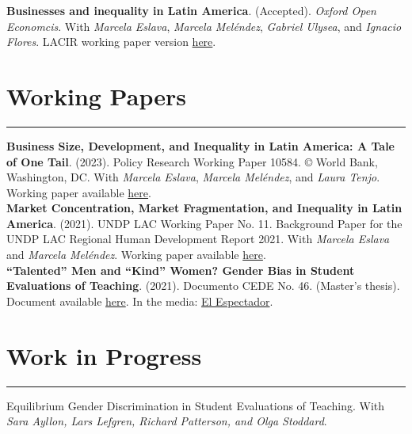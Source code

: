 \documentclass[12pt, letterpaper]{article}
\begin{document}
\noindent \textbf{Businesses and inequality in Latin America}. (Accepted). \textit{Oxford Open Economcis}.   With \textit{Marcela Eslava}, \textit{Marcela Meléndez}, \textit{Gabriel Ulysea}, and \textit{Ignacio Flores}. LACIR working paper version \href{https://eprints.lse.ac.uk/122760/1/WP_138.pdf}{here}. 

\vspace*{-4mm}

\section*{Working Papers}
\vspace*{-8mm}
\noindent \rule{\linewidth}{0.2mm}

\noindent \textbf{Business Size, Development, and Inequality in Latin America: A Tale of One Tail}. (2023). Policy Research Working Paper 10584. © World Bank, Washington, DC. With \textit{Marcela Eslava}, \textit{Marcela Meléndez}, and \textit{Laura Tenjo}. Working paper available \href{https://nicolasurdaneta.github.io/documents/WB_Business_Size.pdf}{here}. \\ [-3mm]

\noindent \textbf{Market Concentration, Market Fragmentation, and Inequality in Latin America}. (2021). UNDP LAC Working Paper No. 11. Background Paper for the UNDP LAC Regional Human Development Report 2021.  With \textit{Marcela Eslava} and \textit{Marcela Meléndez}. Working paper available \href{https://www.latinamerica.undp.org/content/rblac/en/home/library/poverty/market-concentration--market-fragmentation--and-inequality-in-la.html}{here}. \\ [-3mm]

\noindent \textbf{``Talented'' Men and ``Kind'' Women? Gender Bias in Student Evaluations of Teaching}. (2021). Documento CEDE No. 46. (Master's thesis). Document available \href{https://papers.ssrn.com/sol3/papers.cfm?abstract_id=3919797}{here}. In the media: \href{https://www.elespectador.com/educacion/los-profes-crack-y-las-profes-amables-el-sesgo-de-genero-en-las-aulas/}{El Espectador}.

\vspace{-5mm}

\section*{Work in Progress}
\vspace*{-8mm}
\noindent \rule{\linewidth}{0.2mm}
\noindent Equilibrium Gender Discrimination in Student Evaluations of Teaching. With \textit{Sara Ayllon, Lars Lefgren, Richard Patterson, and Olga Stoddard}. \\ [-3mm]
\end{document}
